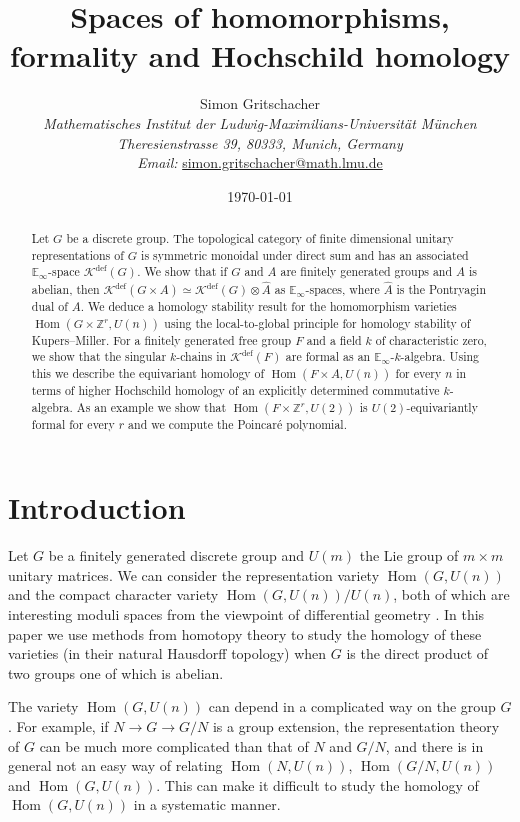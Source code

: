 \documentclass[oneside, a4paper, 12pt]{article}
\title{Spaces of homomorphisms, formality and Hochschild homology}
\author{Simon Gritschacher \\ {\small \itshape Mathematisches Institut der Ludwig-Maximilians-Universit{\"a}t M{\"u}nchen} \\ {\small \itshape Theresienstrasse 39, 80333, Munich, Germany} \\ {\small {\itshape Email:} \url{simon.gritschacher@math.lmu.de}}}
\date{\today}
\numberwithin{equation}{section}
\DeclareMathOperator{\Hom}{Hom}
\newcommand{\Kdef}{\mathcal{K}^{\mathrm{def}}}
\newcommand{\Z}{\mathbb{Z}}
\theoremstyle{plain}
\theoremstyle{definition}
\theoremstyle{remark}
\begin{document}
\maketitle



\begin{abstract}
Let $G$ be a discrete group. The topological category of finite dimensional unitary representations of $G$ is symmetric monoidal under direct sum and has an associated $\mathbb{E}_\infty$-space $\Kdef(G)$. We show that if $G$ and $A$ are finitely generated groups and $A$ is abelian, then $\Kdef(G\times A)\simeq \Kdef(G)\otimes \widehat{A}$ as $\mathbb{E}_\infty$-spaces, where $\widehat{A}$ is the Pontryagin dual of $A$. We deduce a homology stability result for the homomorphism varieties $\Hom(G\times \Z^r,U(n))$ using the local-to-global principle for homology stability of Kupers--Miller. For a finitely generated free group $F$ and a field $k$ of characteristic zero, we show that the singular $k$-chains in $\Kdef(F)$ are formal as an $\mathbb{E}_\infty$-$k$-algebra. Using this we describe the equivariant homology of $\Hom(F \times A,U(n))$ for every $n$ in terms of higher Hochschild homology of an explicitly determined commutative $k$-algebra. As an example we show that $\Hom(F\times \Z^r,U(2))$ is $U(2)$-equivariantly formal for every $r$ and we compute the Poincar{\'e} polynomial.
\end{abstract}

\setcounter{tocdepth}{1}



\section{Introduction} \label{sec:intro}


Let $G$ be a finitely generated discrete group and $U(m)$ the Lie group of $m\times m$ unitary matrices. We can consider the representation variety $\Hom(G,U(n))$ and the compact character variety $\Hom(G,U(n))/U(n)$, both of which are interesting moduli spaces from the viewpoint of differential geometry \cite{BFM, CohenStafa, Goldman}. In this paper we use methods from homotopy theory to study the homology of these varieties (in their natural Hausdorff topology) when $G$ is the direct product of two groups one of which is abelian.

The variety $\Hom(G,U(n))$ can depend in a complicated way on the group $G$. For example, if $N\to G\to G/N$ is a group extension, the representation theory of $G$ can be much more complicated than that of $N$ and $G/N$, and there is in general not an easy way of relating $\Hom(N,U(n))$, $\Hom(G/N,U(n))$ and $\Hom(G,U(n))$. This can make it difficult to study the homology of $\Hom(G,U(n))$ in a systematic manner. 
\end{document}
